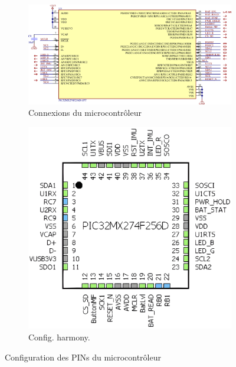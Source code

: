 \begin{figure}[h]
	\centering
	\begin{subfigure}[b]{0.6\textwidth}
		\centering
		\includegraphics[width=1\linewidth]{../figures/etude/sch/MCU}
		\caption{Connexions du microcontrôleur}
		\label{fig:mcu}
	\end{subfigure}
	\hfill
	\begin{subfigure}[b]{0.3\textwidth}
		\centering
		\includegraphics[width=1\linewidth]{../figures/etude/sch/MCU-HARMONY}
		\caption{Config. \gls{harmony}.}
		\label{fig:mcu-harmony}
	\end{subfigure}
	\hfill
	\caption{Configuration des PINs du microcontrôleur}
	\label{fig:sch-connMcu}
\end{figure}

